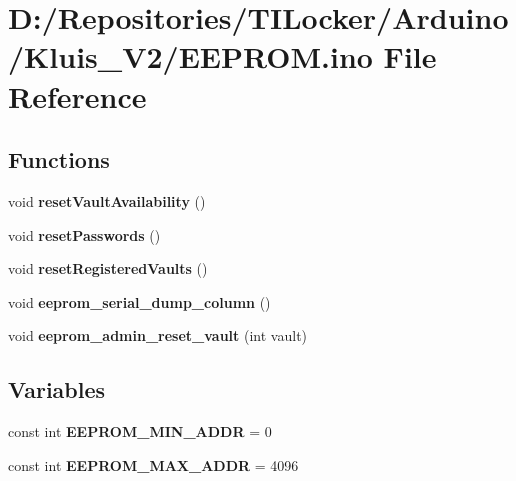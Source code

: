 \hypertarget{_e_e_p_r_o_m_8ino}{}\section{D\+:/\+Repositories/\+T\+I\+Locker/\+Arduino/\+Kluis\+\_\+\+V2/\+E\+E\+P\+R\+OM.ino File Reference}
\label{_e_e_p_r_o_m_8ino}
\subsection*{Functions}
\begin{DoxyCompactItemize}
\item 
\mbox{\label{_e_e_p_r_o_m_8ino_a271b1b3f04906a23333de78b9fe128c8}} 
void {\bfseries reset\+Vault\+Availability} ()
\item 
\mbox{\label{_e_e_p_r_o_m_8ino_a0d6086fa8e9742a93a2c44b1a83efcef}} 
void {\bfseries reset\+Passwords} ()
\item 
\mbox{\label{_e_e_p_r_o_m_8ino_ae74592f8394bd525be9ac9a773e4b9eb}} 
void {\bfseries reset\+Registered\+Vaults} ()
\item 
\mbox{\label{_e_e_p_r_o_m_8ino_af65532811b5ed3dae119d84fafd6666e}} 
void {\bfseries eeprom\+\_\+serial\+\_\+dump\+\_\+column} ()
\item 
\mbox{\label{_e_e_p_r_o_m_8ino_a2c48e27ccb003fd3d184b1f3c6fe8bd5}} 
void {\bfseries eeprom\+\_\+admin\+\_\+reset\+\_\+vault} (int vault)
\end{DoxyCompactItemize}
\subsection*{Variables}
\begin{DoxyCompactItemize}
\item 
\mbox{\label{_e_e_p_r_o_m_8ino_aaf13f9e173756ea8cede3788684f2b4d}} 
const int {\bfseries E\+E\+P\+R\+O\+M\+\_\+\+M\+I\+N\+\_\+\+A\+D\+DR} = 0
\item 
\mbox{\label{_e_e_p_r_o_m_8ino_a6528ce3d302c31f17b22c86d821fa549}} 
const int {\bfseries E\+E\+P\+R\+O\+M\+\_\+\+M\+A\+X\+\_\+\+A\+D\+DR} = 4096
\end{DoxyCompactItemize}
